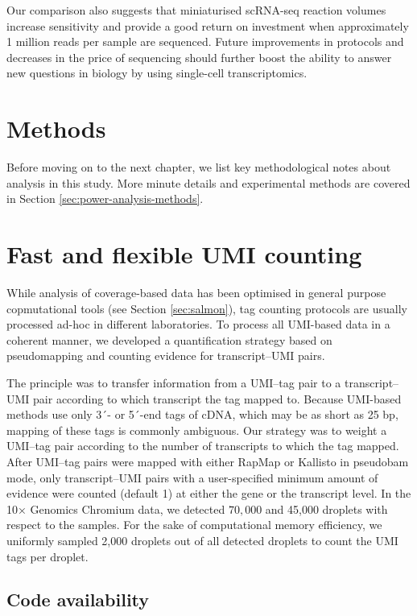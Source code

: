 Our comparison also suggests that miniaturised scRNA-seq reaction volumes increase sensitivity and provide a good return on investment when approximately 1 million reads per sample are sequenced. Future improvements in protocols and decreases in the price of sequencing should further boost the ability to answer new questions in biology by using single-cell transcriptomics.

\section{Methods}

Before moving on to the next chapter, we list key methodological notes about analysis in this study. More minute details and experimental methods are covered in Section \ref{sec:power-analysis-methods}.

\section{Fast and flexible UMI counting}

While analysis of coverage-based data has been optimised in general purpose copmutational tools (see Section \ref{sec:salmon}), tag counting protocols are usually processed ad-hoc in different laboratories. To process all UMI-based data in a coherent manner, we developed a quantification strategy based on pseudomapping and counting evidence for transcript–UMI pairs.

The principle was to transfer information from a UMI–tag pair to a transcript–UMI pair according to which transcript the tag mapped to. Because UMI-based methods use only 3´- or 5´-end tags of cDNA, which may be as short as 25 bp, mapping of these tags is commonly ambiguous. Our strategy was to weight a UMI–tag pair according to the number of transcripts to which the tag mapped. After UMI–tag pairs were mapped with either RapMap \cite{Srivastava2016-nx} or Kallisto \cite{Bray2016-dh} in pseudobam mode, only transcript–UMI pairs with a user-specified minimum amount of evidence were counted (default 1) at either the gene or the transcript level. In the 10× Genomics Chromium data, we detected \( 70,000 \) and 45,000 droplets with respect to the samples. For the sake of computational memory efficiency, we uniformly sampled 2,000 droplets out of all detected droplets to count the UMI tags per droplet.

\subsection{Code availability}

